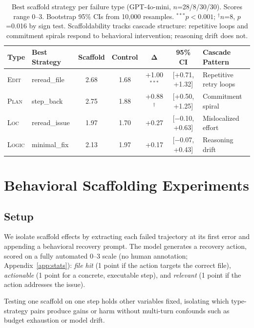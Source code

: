 \documentclass[11pt]{article}
\begin{document}
\begin{table}[t]
\centering
\small
\begin{tabular}{@{}llccccl@{}}
\toprule
\textbf{Type} & \textbf{Best Strategy} & \textbf{Scaffold} & \textbf{Control} & $\boldsymbol{\Delta}$ & \textbf{95\% CI} & \textbf{Cascade Pattern} \\
\midrule
\textsc{Edit} & reread\_file & 2.68 & 1.68 & +1.00$^{***}$ & [+0.71, +1.32] & Repetitive retry loops \\
\textsc{Plan} & step\_back & 2.75 & 1.88 & +0.88$^\dagger$ & [+0.50, +1.25] & Commitment spiral \\
\textsc{Loc} & reread\_issue & 1.97 & 1.70 & +0.27 & [$-$0.10, +0.63] & Mislocalized effort \\
\textsc{Logic} & minimal\_fix & 2.13 & 1.97 & +0.17 & [$-$0.07, +0.43] & Reasoning drift \\
\bottomrule
\end{tabular}
\caption{Best scaffold strategy per failure type (GPT-4o-mini, $n$=28/8/30/30). Scores range 0--3. Bootstrap 95\% CIs from 10,000 resamples. $^{***}p<0.001$; $^\dagger$$n$=8, $p$=0.016 by sign test. Scaffoldability tracks cascade structure: repetitive loops and commitment spirals respond to behavioral intervention; reasoning drift does not.}
\label{tab:scaffold-main}
\end{table}


\section{Behavioral Scaffolding Experiments}
\label{sec:scaffolding}

\subsection{Setup}

We isolate scaffold effects by extracting each failed trajectory at its first error and appending a behavioral recovery prompt.
The model generates a recovery action, scored on a fully automated 0--3 scale (no human annotation; Appendix~\ref{app:stats}): \textit{file hit} (1 point if the action targets the correct file), \textit{actionable} (1 point for a concrete, executable step), and \textit{relevant} (1 point if the action addresses the issue).

Testing one scaffold on one step holds other variables fixed, isolating which type-strategy pairs produce gains or harm without multi-turn confounds such as budget exhaustion or model drift.
\end{document}
